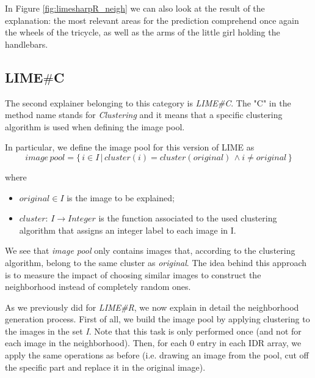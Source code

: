\documentclass[12pt, twoside, a4paper]{report}
\begin{document}

In Figure \ref{fig:limesharpR_neigh} we can also look at the result of the explanation: the most relevant areas for the prediction comprehend once again the wheels of the tricycle, as well as the arms of the little girl holding the handlebars.


\subsection{LIME$\#$C}

The second explainer belonging to this category is \textit{LIME\#C}. The "C" in the method name stands for \textit{Clustering} and it means that a specific clustering algorithm is used when defining the image pool.

In particular, we define the image pool for this version of LIME as 
\begin{equation}\label{eqn:limesharpC_pool}
image\,pool = \{\,i \in I\, |\, cluster(i) = cluster(original)\, \land i \neq original \,\}
\end{equation}

\noindent
where 

\begin{itemize}
\item $original \in I$ is the image to be explained;
\item $cluster:\, I \rightarrow Integer$ is the function associated to the used clustering algorithm that assigns an integer label to each image in I.
\end{itemize}

We see that \textit{image pool} only contains images that, according to the clustering algorithm, belong to the same cluster as \textit{original}. The idea behind this approach is to measure the impact of choosing similar images to construct the neighborhood instead of completely random ones.

As we previously did for \textit{LIME\#R}, we now explain in detail the neighborhood generation process. First of all, we build the image pool by applying clustering to the images in the set \textit{I}. Note that this task is only performed once (and not for each image in the neighborhood).
Then, for each 0 entry in each IDR array, we apply the same operations as before (i.e. drawing an image from the pool, cut off the specific part and replace it in the original image).
\end{document}
